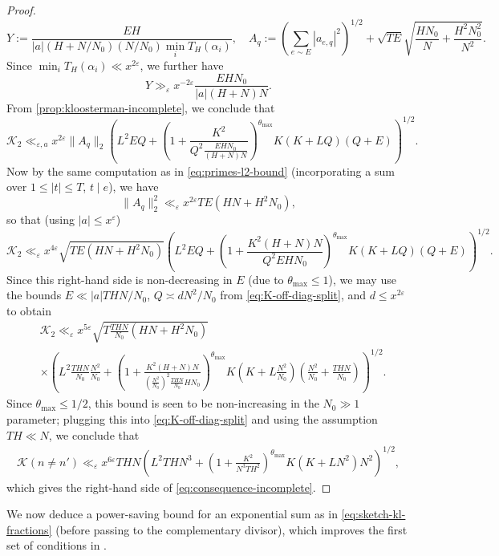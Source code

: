 \documentclass[reqno,11pt]{amsart}
\theoremstyle{remark}
\numberwithin{equation}{section}
\newcommand{\mK}{\mathcal{K}}
\newcommand{\eps}{\varepsilon}
\begin{document}
\begin{proof}
\[
    Y := \frac{E H}{|a|(H+N/N_0)(N/N_0) \min_i T_H(\alpha_i)},
    \quad
    A_q := \left(\sum_{e \sim E} |a_{e,q}|^2\right)^{1/2} + \sqrt{TE} \sqrt{\frac{H N_0}{N} + \frac{H^2 N_0^2}{N^2}}.
\]
Since $\min_i T_H(\alpha_i) \ll x^{2\eps}$,
we further have
\[
    Y \gg_\eps x^{-2\eps}\frac{E H N_0}{|a|(H+N)N}.
\]
From \cref{prop:kloosterman-incomplete}, we conclude that 
\[
    \mK_2 \ll_{\eps,a} x^{2\eps} \|A_q\|_2 \left(L^2 E Q + \left(1 + \frac{K^2}{Q^2 \frac{EHN_0}{(H+N)N}}\right)^{\theta_{\max}} K (K + LQ)(Q + E) \right)^{1/2}.
\]
Now by the same computation as in \cref{eq:primes-l2-bound} (incorporating a sum over $1 \le |t| \le T$, $t \mid e$), we have
\[
    \|A_q\|_2^2 \ll_\eps x^{2\eps} T E(HN + H^2 N_0),
\]
so that (using $|a| \le x^{\eps}$)
\[
    \mK_2 \ll_{\eps} x^{4\eps} \sqrt{T E(HN + H^2 N_0)} \left(L^2 E Q + \left(1 + \frac{K^2 (H+N)N}{Q^2 EHN_0}\right)^{\theta_{\max}} K (K + LQ)(Q + E) \right)^{1/2}.
\]
Since this right-hand side is non-decreasing in $E$ (due to $\theta_{\max} \le 1$), we may use the bounds $E \ll |a|THN/N_0$, $Q \asymp dN^2/N_0$ from \cref{eq:K-off-diag-split}, and $d \le x^{2\eps}$ to obtain 
\[
\begin{aligned}
    &\mK_2 \ll_{\eps} x^{5\eps} \sqrt{T \frac{THN}{N_0}(HN + H^2 N_0)} 
    \\
    &\times \left(L^2 \frac{THN}{N_0} \frac{N^2}{N_0} + \left(1 + \frac{K^2 (H+N)N}{\left(\frac{N^2}{N_0}\right)^2 \frac{THN}{N_0} HN_0}\right)^{\theta_{\max}} K \left(K + L\frac{N^2}{N_0}\right)\left(\frac{N^2}{N_0} + \frac{THN}{N_0}\right) \right)^{1/2}.
\end{aligned}
\]
Since $\theta_{\max} \le 1/2$, this bound is seen to be non-increasing in the $N_0 \gg 1$ parameter; plugging this into \cref{eq:K-off-diag-split} and using the assumption $TH \ll N$, we conclude that
\[
\begin{aligned}
    \mK(n \neq n') \ll_{\eps} x^{6\eps} THN 
    \left(L^2 TH N^3 + \left(1 + \frac{K^2}{N^3 TH^2}\right)^{\theta_{\max}} K \left(K + LN^2\right)N^2 \right)^{1/2},
\end{aligned}
\]
which gives the right-hand side of \cref{eq:consequence-incomplete}.
\end{proof}

We now deduce a power-saving bound for an exponential sum as in \cref{eq:sketch-kl-fractions} (before passing to the complementary divisor), which improves the first set of conditions in \cite[Proposition 1]{drappeau2015theoremes}.
\end{document}
